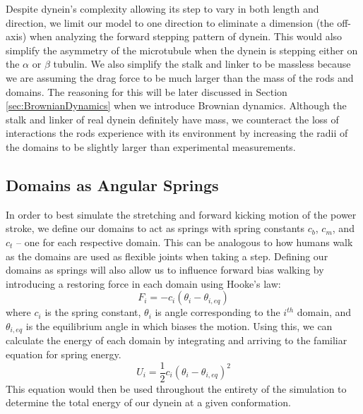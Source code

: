 Despite dynein's complexity allowing its step to vary in both length and direction, we limit our model to one direction to eliminate a dimension (the off-axis) when analyzing the forward stepping pattern of dynein. This would also simplify the asymmetry of the microtubule when the dynein is stepping either on the $\alpha$ or $\beta$ tubulin. We also simplify the stalk and linker to be massless because we are assuming the drag force to be much larger than the mass of the rods and domains. The reasoning for this will be later discussed in Section \ref{sec:BrownianDynamics} when we introduce Brownian dynamics. Although the stalk and linker of real dynein definitely have mass, we counteract the loss of interactions the rods experience with its environment by increasing the radii of the domains to be slightly larger than experimental measurements.

\subsection{Domains as Angular Springs}
In order to best simulate the stretching and forward kicking motion of the power stroke, we define our domains to act as springs with spring constants $c_b$, $c_m$, and $c_t$ -- one for each respective domain. This can be analogous to how humans walk as the domains are used as flexible joints when taking a step. Defining our domains as springs will also allow us to influence forward bias walking by introducing a restoring force in each domain using Hooke's law: 
\begin{equation}
    F_i=-c_i(\theta_i-\theta_{i,eq})
\end{equation}
where $c_i$ is the spring constant, $\theta_i$ is angle corresponding to the $i^{th}$ domain, and $\theta_{i,eq}$ is the equilibrium angle in which biases the motion. Using this, we can calculate the energy of each domain by integrating and arriving to the familiar equation for spring energy.
\begin{equation} \label{eqn:energy}
    U_i=\frac{1}{2}c_i(\theta_i-\theta_{i,eq})^2
\end{equation}
This equation would then be used throughout the entirety of the simulation to determine the total energy of our dynein at a given conformation. 


